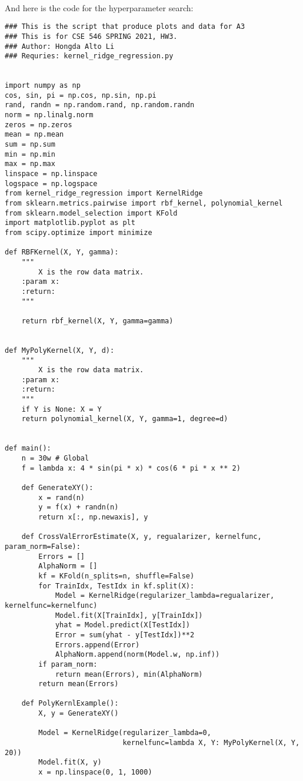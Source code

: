 \documentclass[]{article}
\begin{document}
        \\
        And here is the code for the hyperparameter search: 
        \begin{lstlisting}
### This is the script that produce plots and data for A3
### This is for CSE 546 SPRING 2021, HW3.
### Author: Hongda Alto Li
### Requries: kernel_ridge_regression.py


import numpy as np
cos, sin, pi = np.cos, np.sin, np.pi
rand, randn = np.random.rand, np.random.randn
norm = np.linalg.norm
zeros = np.zeros
mean = np.mean
sum = np.sum
min = np.min
max = np.max
linspace = np.linspace
logspace = np.logspace
from kernel_ridge_regression import KernelRidge
from sklearn.metrics.pairwise import rbf_kernel, polynomial_kernel
from sklearn.model_selection import KFold
import matplotlib.pyplot as plt
from scipy.optimize import minimize

def RBFKernel(X, Y, gamma):
    """
        X is the row data matrix.
    :param x:
    :return:
    """

    return rbf_kernel(X, Y, gamma=gamma)


def MyPolyKernel(X, Y, d):
    """
        X is the row data matrix.
    :param x:
    :return:
    """
    if Y is None: X = Y
    return polynomial_kernel(X, Y, gamma=1, degree=d)


def main():
    n = 30w # Global
    f = lambda x: 4 * sin(pi * x) * cos(6 * pi * x ** 2)

    def GenerateXY():
        x = rand(n)
        y = f(x) + randn(n)
        return x[:, np.newaxis], y

    def CrossValErrorEstimate(X, y, regualarizer, kernelfunc, param_norm=False):
        Errors = [] 
        AlphaNorm = []
        kf = KFold(n_splits=n, shuffle=False)
        for TrainIdx, TestIdx in kf.split(X):
            Model = KernelRidge(regularizer_lambda=regualarizer, kernelfunc=kernelfunc)
            Model.fit(X[TrainIdx], y[TrainIdx])
            yhat = Model.predict(X[TestIdx])
            Error = sum(yhat - y[TestIdx])**2
            Errors.append(Error)
            AlphaNorm.append(norm(Model.w, np.inf))
        if param_norm:
            return mean(Errors), min(AlphaNorm)
        return mean(Errors)

    def PolyKernlExample():
        X, y = GenerateXY()

        Model = KernelRidge(regularizer_lambda=0,
                            kernelfunc=lambda X, Y: MyPolyKernel(X, Y, 20))
        Model.fit(X, y)
        x = np.linspace(0, 1, 1000)


\end{lstlisting}
\end{document}
